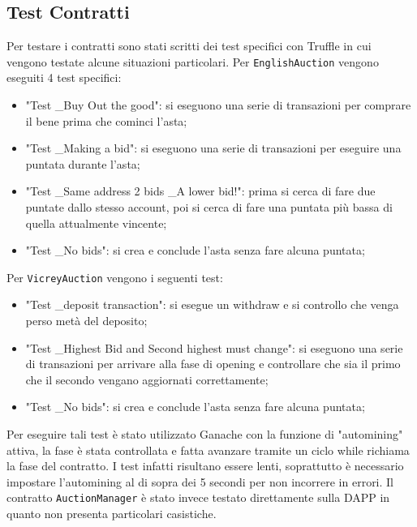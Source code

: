 \subsection{Test Contratti}
Per testare i contratti sono stati scritti dei test specifici con Truffle in cui vengono testate alcune situazioni particolari. Per \texttt{EnglishAuction} vengono eseguiti 4 test specifici:
\begin{itemize}
	\item "Test \_Buy Out the good": si eseguono una serie di transazioni per comprare il bene prima che cominci l'asta;
	\item "Test \_Making a bid": si eseguono una serie di transazioni per eseguire una puntata durante l'asta;
	\item "Test \_Same address 2 bids \_A lower bid!": prima si cerca di fare due puntate dallo stesso account, poi si cerca di fare una puntata più bassa di quella attualmente vincente;
	\item "Test \_No bids": si crea e conclude l'asta senza fare alcuna puntata;
\end{itemize}
Per \texttt{VicreyAuction} vengono i seguenti test:
\begin{itemize}
	\item "Test \_deposit transaction": si esegue un withdraw e si controllo che venga perso metà del deposito;
	\item "Test \_Highest Bid and Second highest must change": si eseguono una serie di transazioni per arrivare alla fase di opening e controllare che sia il primo che il secondo vengano aggiornati correttamente;
	\item "Test \_No bids": si crea e conclude l'asta senza fare alcuna puntata;
\end{itemize}
Per eseguire tali test è stato utilizzato Ganache con la funzione di "automining" attiva, la fase è stata controllata e fatta avanzare tramite un ciclo while richiama la fase del contratto. I test infatti risultano essere lenti, soprattutto è necessario impostare l'automining al di sopra dei 5 secondi per non incorrere in errori.\newline
Il contratto \texttt{AuctionManager} è stato invece testato direttamente sulla DAPP in quanto non presenta particolari casistiche.
